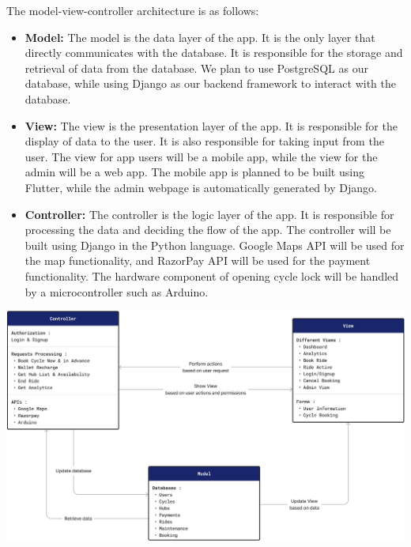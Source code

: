 \documentclass[11pt]{article}
\begin{document}
The model-view-controller architecture is as follows:
\begin{itemize}
  \item \textbf{Model:} The model is the data layer of the app. It is the only layer that directly communicates with the database. It is responsible for the storage and retrieval of data from the database. We plan to use PostgreSQL as our database, while using Django as our backend framework to interact with the database.
  \item \textbf{View:} The view is the presentation layer of the app. It is responsible for the display of data to the user. It is also responsible for taking input from the user. The view for app users will be a mobile app, while the view for the admin will be a web app. The mobile app is planned to be built using Flutter, while the admin webpage is automatically generated by Django.
  \item \textbf{Controller:} The controller is the logic layer of the app. It is responsible for processing the data and deciding the flow of the app. The controller will be built using Django in the Python language. Google Maps API will be used for the map functionality, and RazorPay API will be used for the payment functionality. The hardware component of opening cycle lock will be handled by a microcontroller such as Arduino.
\end{itemize}
\begin{center}
  \includegraphics[scale=0.2]{architecture-images/overall.png}
\end{center}

\newpage
\section{}
\end{document}
